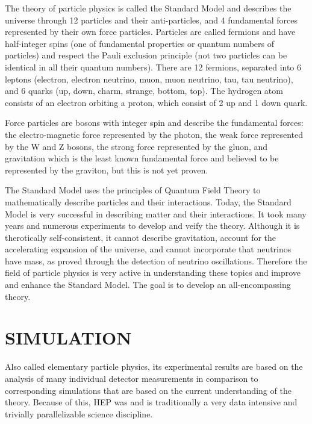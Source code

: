 \documentclass{wscpaperproc}
\theoremstyle{wsc}
\begin{document}
The theory of particle physics is called the Standard Model and describes the universe through 12 particles and their anti-particles, and 4 fundamental forces represented by their own force particles. Particles are called fermions and have half-integer spins (one of fundamental properties or quantum numbers of particles) and respect the Pauli exclusion principle (not two particles can be identical in all their quantum numbers). There are 12 fermions, separated into 6 leptons (electron, electron neutrino, muon, muon neutrino, tau, tau neutrino), and 6 quarks (up, down, charm, strange, bottom, top). The hydrogen atom consists of an electron orbiting a proton, which consist of 2 up and 1 down quark.

Force particles are bosons with integer spin and describe the fundamental forces: the electro-magnetic force represented by the photon, the weak force represented by the W and Z bosons, the strong force represented by the gluon, and gravitation which is the least known fundamental force and believed to be represented by the graviton, but this is not yet proven.

The Standard Model uses the principles of Quantum Field Theory to mathematically describe particles and their interactions. Today, the Standard Model is very successful in describing matter and their interactions. It took many years and numerous experiments to develop and veify the theory. Although it is therotically self-consistent, it cannot describe gravitation, account for the accelerating expansion of the universe, and cannot incorporate that neutrinos have mass, as proved through the detection of neutrino oscillations. Therefore the field of particle physics is very active in understanding these topics and improve and enhance the Standard Model. The goal is to develop an all-encompassing theory.

\section{SIMULATION}
\label{sec:simulation}






















Also called elementary particle physics, its experimental results are based on the analysis of many individual detector measurements in comparison to corresponding simulations that are based on the current understanding of the theory. Because of this, HEP was and is traditionally a very data intensive and trivially parallelizable science discipline.
\end{document}
